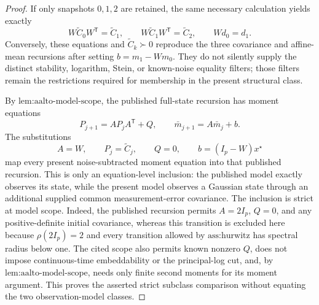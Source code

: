 \documentclass{article}
\begin{document}
\begin{proof}
If only snapshots \(0,1,2\) are retained, the same necessary calculation yields exactly
\[
 W\widetilde C_0W^{\mathsf T}=\widetilde C_1,
 \qquad
 W\widetilde C_1W^{\mathsf T}=\widetilde C_2,
 \qquad
 Wd_0=d_1.
\]
Conversely, these equations and \(\widetilde C_k\succ0\) reproduce the three covariance and affine-mean recursions after setting \(b=m_1-Wm_0\).  They do not silently supply the distinct stability, logarithm, Stein, or known-noise equality filters; those filters remain the restrictions required for membership in the present structural class.

By \(\text{lem:aalto-model-scope}\), the published full-state recursion has moment equations
\[
 P_{j+1}=AP_jA^{\mathsf T}+Q,
 \qquad
 \bar m_{j+1}=A\bar m_j+b.
\]
The substitutions
\[
 A=W,
 \qquad
 P_j=\widetilde C_j,
 \qquad
 Q=0,
 \qquad
 b=(I_p-W)x^\star
\]
map every present noise-subtracted moment equation into that published recursion.  This is only an equation-level inclusion: the published model exactly observes its state, while the present model observes a Gaussian state through an additional supplied common measurement-error covariance.  The inclusion is strict at model scope.  Indeed, the published recursion permits \(A=2I_p\), \(Q=0\), and any positive-definite initial covariance, whereas this transition is excluded here because \(\rho(2I_p)=2\) and every transition allowed by \(\text{ass:hurwitz}\) has spectral radius below one.  The cited scope also permits known nonzero \(Q\), does not impose continuous-time embeddability or the principal-log cut, and, by \(\text{lem:aalto-model-scope}\), needs only finite second moments for its moment argument.  This proves the asserted strict subclass comparison without equating the two observation-model classes.


\end{proof}
\end{document}
